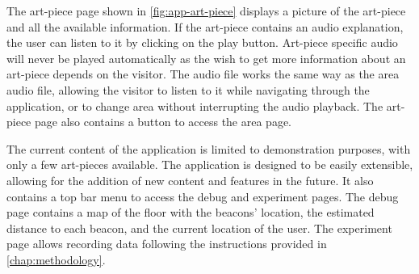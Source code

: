 The art-piece page shown in \autoref{fig:app-art-piece} displays a picture of the art-piece and all the available information. If the art-piece contains an audio explanation, the user can listen to it by clicking on the play button. Art-piece specific audio will never be played automatically as the wish to get more information about an art-piece depends on the visitor. The audio file works the same way as the area audio file, allowing the visitor to listen to it while navigating through the application, or to change area without interrupting the audio playback. The art-piece page also contains a button to access the area page.

The current content of the application is limited to demonstration purposes, with only a few art-pieces available. The application is designed to be easily extensible, allowing for the addition of new content and features in the future. It also contains a top bar menu to access the debug and experiment pages. The debug page contains a map of the floor with the beacons' location, the estimated distance to each beacon, and the current location of the user. The experiment page allows recording data following the instructions provided in \autoref{chap:methodology}.

